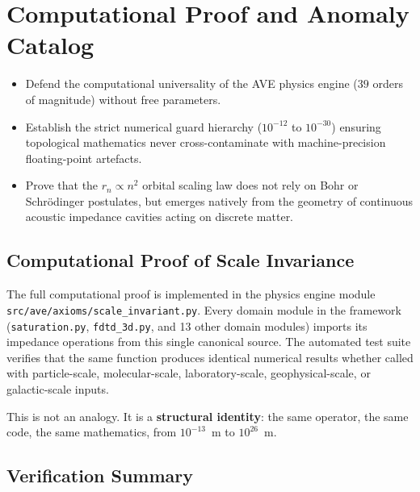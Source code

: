 
\chapter{Computational Proof and Anomaly Catalog}
\label{ch:computational_proof}

\begin{objectivebox}
\begin{itemize}
    \item Defend the computational universality of the AVE physics engine ($39$ orders of magnitude) without free parameters.
    \item Establish the strict numerical guard hierarchy ($10^{-12}$ to $10^{-30}$) ensuring topological mathematics never cross-contaminate with machine-precision floating-point artefacts.
    \item Prove that the $r_n \propto n^2$ orbital scaling law does not rely on Bohr or Schrödinger postulates, but emerges natively from the geometry of continuous acoustic impedance cavities acting on discrete matter.
\end{itemize}
\end{objectivebox}

\section{Computational Proof of Scale Invariance}

The full computational proof is implemented in the physics engine module
\texttt{src/ave/}\allowbreak\texttt{axioms/}\allowbreak\texttt{scale\_}\allowbreak\texttt{invariant.py}. Every domain module in the
framework (\texttt{saturation.py}, \texttt{fdtd\_3d.py}, and 13 other domain modules) imports its impedance
operations from this single canonical source. The automated test suite
verifies that the same
function produces identical numerical results whether called with
particle-scale, molecular-scale, laboratory-scale, geophysical-scale,
or galactic-scale inputs.

This is not an analogy. It is a \textbf{structural identity}: the same
operator, the same code, the same mathematics, from $10^{-13}$~m to
$10^{26}$~m.

\section{Verification Summary}

